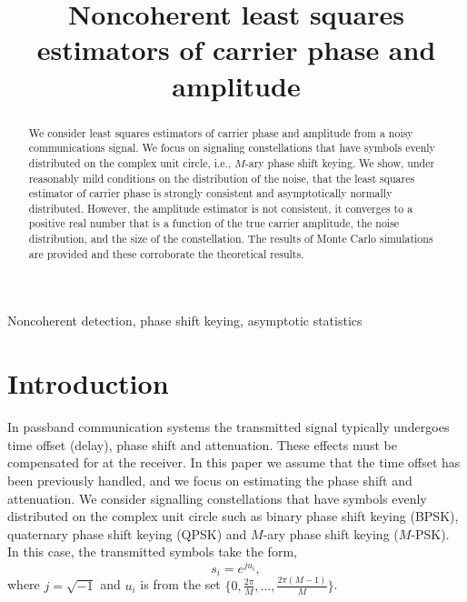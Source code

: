 \documentclass{article}
\title{Noncoherent least squares estimators of carrier phase and amplitude}
\begin{document}
\maketitle

\begin{abstract}
We consider least squares estimators of carrier phase and amplitude from a noisy communications signal.  We focus on signaling constellations that have symbols evenly distributed on the complex unit circle, i.e., $M$-ary phase shift keying.  We show, under reasonably mild conditions on the distribution of the noise, that the least squares estimator of carrier phase is strongly consistent and asymptotically normally distributed.  However, the amplitude estimator is not consistent, it converges to a positive real number that is a function of the true carrier amplitude, the noise distribution, and the size of the constellation.  The results of Monte Carlo simulations are provided and these corroborate the theoretical results.
\end{abstract}
\begin{keywords}
Noncoherent detection, phase shift keying, asymptotic statistics
\end{keywords}

\section{Introduction}

\newcommand{\calC}{\mathcal C}

In passband communication systems the transmitted signal typically undergoes time offset (delay), phase shift and attenuation.  These effects must be compensated for at the receiver. In this paper we assume that the time offset has been previously handled, and we focus on estimating the phase shift and attenuation.  We consider signalling constellations that have symbols evenly distributed on the complex unit circle such as binary phase shift keying (BPSK), quaternary phase shift keying (QPSK) and $M$-ary phase shift keying ($M$-PSK).  In this case, the transmitted symbols take the form,
\[
s_i = e^{j u_i},
\]
where $j = \sqrt{-1}$ and $u_i$ is from the set $\{0, \tfrac{2\pi}{M}, \dots, \tfrac{2\pi(M-1)}{M}\}$. %
\end{document}
